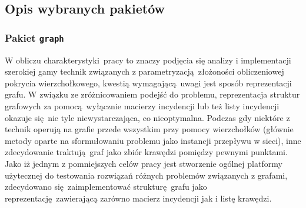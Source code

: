 \subsection{Opis wybranych pakietów}\label{ss_internals_important_packages}
\subsubsection{\textbf{Pakiet \texttt{graph}}}
\par{
  W obliczu charakterystyki pracy to znaczy podjęcia się analizy i implementacji szerokiej gamy technik związanych z parametryzacją złożoności obliczeniowej pokrycia wierzchołkowego, kwestią wymagającą uwagi jest sposób reprezentacji grafu.
  W związku ze zróżnicowaniem podejść do problemu, reprezentacja struktur grafowych za pomocą wyłącznie macierzy incydencji lub też listy incydencji okazuje się nie tyle niewystarczająca, co nieoptymalna.
  Podczas gdy niektóre z technik operują na grafie przede wszystkim przy pomocy wierzchołków (głównie metody oparte na sformułowaniu problemu jako instancji przepływu w sieci), inne zdecydowanie traktują graf jako zbiór krawędzi pomiędzy pewnymi punktami.
  Jako iż jednym z pomniejszych celów pracy jest stworzenie ogólnej platformy użytecznej do testowania rozwiązań różnych problemów związanych z grafami, zdecydowano się zaimplementować strukturę grafu jako reprezentację zawierającą zarówno macierz incydencji jak i listę krawędzi.
}
